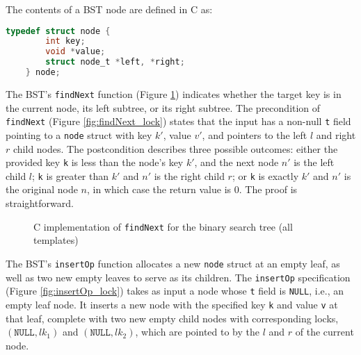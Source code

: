 \documentclass[sigplan,10pt, screen]{acmart}
\begin{document}
The contents of a BST node are defined in C as:
\begin{lstlisting}[language = C, backgroundcolor=\color{white}, basicstyle=\ttfamily\footnotesize]
	typedef struct node {
		int key; 
		void *value; 
		struct node_t *left, *right;
	} node;
\end{lstlisting}
The BST's \lstinline{findNext} function (Figure \ref{findnext}) indicates whether the target key is in the current node, its left subtree, or its right subtree. The precondition of \texttt{findNext} (Figure \ref*{fig:findNext_lock}) states that the input has a non-null \texttt{t} field pointing to a \texttt{node} struct with key $k'$, value $v'$, and pointers to the left $l$ and right $r$ child nodes. The postcondition describes three possible outcomes: either the provided key \texttt{k} is less than the node's key $k'$, and the next node $n'$ is the left child $l$; \lstinline{k} is greater than $k'$ and $n'$ is the right child $r$; or \lstinline{k} is exactly $k'$ and $n'$ is the original node $n$, in which case the return value is 0. The proof is straightforward.

\begin{figure}[ht]
	 
	\caption{C implementation of \lstinline{findNext} for the binary search tree (all templates)}
	\label{findnext}
\end{figure}

The BST's \lstinline{insertOp} function allocates a new \lstinline{node} struct at an empty leaf, as well as two new empty leaves to serve as its children. The \texttt{insertOp} specification (Figure \ref{fig:insertOp_lock}) takes as input a node whose \lstinline{t} field is \lstinline{NULL}, i.e., an empty leaf node. It inserts a new node with the specified key \texttt{k} and value \texttt{v} at that leaf, complete with two new empty child nodes with corresponding locks, $(\texttt{NULL}, \mathit{lk}_1)$ and $(\texttt{NULL}, \mathit{lk}_2)$, which are pointed to by the $l$ and $r$ of the current node.
\end{document}
